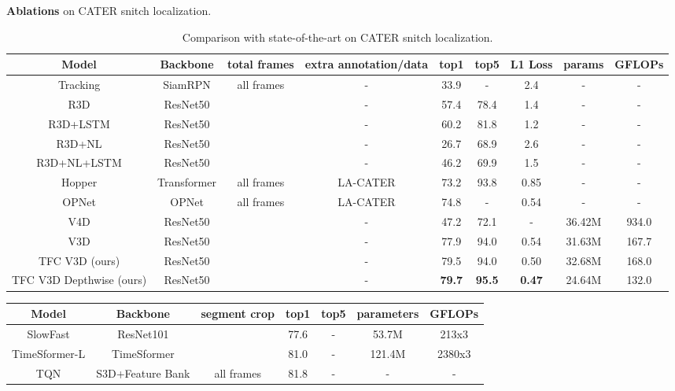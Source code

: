 \documentclass[nohyperref]{article}
\newcommand{\tablestyle}[2]{\setlength{\tabcolsep}{#1}\renewcommand{\arraystretch}{#2}\centering\footnotesize}
\theoremstyle{plain}
\theoremstyle{definition}
\theoremstyle{remark}
\begin{document}
{{\begin{table*}[t]
\vspace{-4mm}
\caption{\textbf{Ablations} on CATER snitch localization.}
\label{tab:mini-kinetics}
\end{table*}
\begin{table*}[!htb]
\tablestyle{3pt}{1}
\begin{center}
\begin{tabular}{c|c|c|c|c|c|c|c|c}
\hline
{Model} & {Backbone} & {total frames } &{ extra annotation/data} & {top1} & {top5} & {L1 Loss} & {params} & {GFLOPs}\\
\hline
Tracking\cite{zhu2018distractoraware} & {SiamRPN} & {all frames} & {-}& 33.9 & -&2.4&-&- \\
R3D\cite{DBLP:conf/cvpr/0004GGH18}  &{ResNet50} & {} &{-} &57.4 & 78.4 &1.4&-&-\\
R3D+LSTM\cite{Girdhar2020CATER:}&{ResNet50}&{}&-&60.2 &81.8& 1.2&-&-\\
R3D+NL\cite{DBLP:conf/cvpr/0004GGH18}&{ResNet50} & {} &-&26.7 & 68.9 & 2.6&-&-\\
R3D+NL+LSTM\cite{Girdhar2020CATER:}  &{ResNet50} & {} &- &46.2& 69.9& 1.5&-&-\\
Hopper\cite{zhou2021hopper}  & {Transformer} & {all frames } &{LA-CATER\cite{shamsian2020learning}} & 73.2 & 93.8 & 0.85&-&-\\
OPNet\cite{shamsian2020learning} & {OPNet} & {all frames} &{LA-CATER\cite{shamsian2020learning}}&74.8 & - & 0.54&-&-\\

V4D \cite{Zhang2020V4D:}&{ResNet50} & {} & {-} & 47.2 &  72.1 & -&36.42M &934.0\\
\hline
V3D & {ResNet50} & {}&-&77.9&94.0&0.54 &31.63M & 167.7  \\
TFC V3D (ours)&{ResNet50} & {}&-&79.5&94.0&0.50&32.68M&168.0\\
TFC V3D Depthwise (ours) & {ResNet50} & {}&- & {\bf 79.7} &{\bf 95.5} & {\bf 0.47}&24.64M&132.0\\
\hline
\end{tabular}
\end{center}
\vspace{-5mm}
\caption{Comparison with state-of-the-art on CATER snitch localization.}
\label{cmp_miniart}
\end{table*}
\begin{table*}[!htb]
\begin{center}
\begin{tabular}{c|c|c|c|c|c|c}
\hline
{Model} & {Backbone} & {segment  crop }  & {top1} & {top5} &  {parameters} & {GFLOPs}\\
\hline
SlowFast \cite{DBLP:journals/corr/abs-1812-03982}& {ResNet101} & {} &77.6& -& 53.7M &213x3 \\
TimeSformer-L\cite{bertasius2021spacetime} & {TimeSformer}  & {}  &81.0 &-&121.4M &2380x3\\
TQN\cite{zhangtqn}&{S3D+Feature Bank}&all frames&81.8&- &- &-\\
\hline


\end{tabular}
\end{center}
\end{table*}}}
\end{document}
